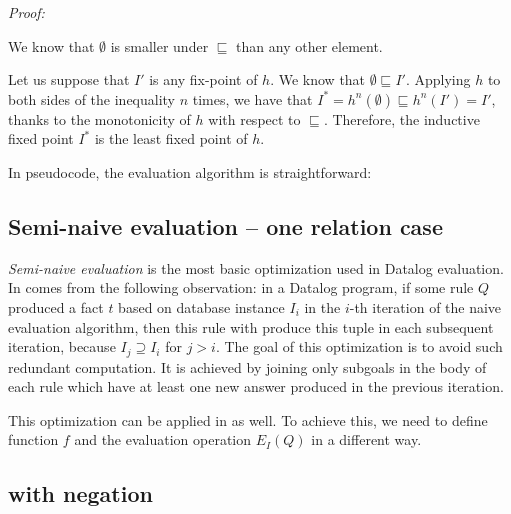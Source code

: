 \emph{Proof:} 

We know that $\emptyset$ is smaller under $\sqsubseteq$ than any other element.

Let us suppose that $I'$ is any fix-point of $h$.  We know that $\emptyset \sqsubseteq I'$. Applying $h$ to both sides of the inequality $n$ times, we have that $I^* = h^n(\emptyset) \sqsubseteq h^n(I') = I'$, thanks to the monotonicity of $h$ with respect to $\sqsubseteq$. Therefore, the inductive fixed point $I^*$ is the least fixed point of $h$.

In pseudocode, the evaluation algorithm is straightforward:

\begin{figure}[h!]
\end{figure}



\subsection{Semi-naive evaluation -- one relation case}
\emph{Semi-naive evaluation} is the most basic optimization used in Datalog evaluation. In comes from the following observation: in a Datalog program, if some rule $Q$ produced a fact $t$ based on database instance $I_i$ in the $i$-th iteration of the naive evaluation algorithm, then this rule with produce this tuple in each subsequent iteration, because $I_j \supseteq I_i$ for $j > i$. The goal of this optimization is to avoid such redundant computation. It is achieved by joining only subgoals in the body of each rule which have at least one new answer produced in the previous iteration.

This optimization can be applied in \datalogra as well. To achieve this, we need to define function $f$ and the evaluation operation $E_I(Q)$ in a different way.




\subsection{\datalogra with negation}


